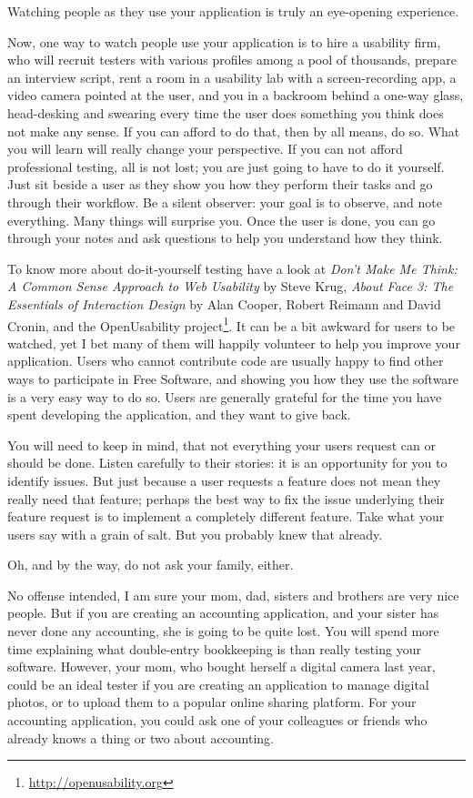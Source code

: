 Watching people as they use your application is truly an eye-opening experience.

Now, one way to watch people use your application is to hire a usability firm,
who will recruit testers with various profiles among a pool of thousands,
prepare an interview script, rent a room in a usability lab with a
screen-recording app, a video camera pointed at the user, and you in a
backroom behind a one-way glass, head-desking and swearing every time the user
does something you think does not make any sense. If you can afford to do that,
then by all means, do so. What you will learn will really change your
perspective. If you can not afford professional testing, all is not lost; you
are just going to have to do it yourself. Just sit beside a user as they show
you how they perform their tasks and go through their workflow. Be a silent
observer: your goal is to observe, and note everything. Many things will
surprise you. Once the user is done, you can go through your notes and ask
questions to help you understand how they think.

To know more about
do-it-yourself testing have a look at \textit{Don't Make Me Think: A Common
Sense Approach to Web Usability} by Steve Krug, \textit{About Face 3: The
Essentials of Interaction Design} by Alan Cooper, Robert Reimann and David
Cronin, and the OpenUsability project\footnote{\url{http://openusability.org}}.
It can be a bit awkward for users to be watched, yet I bet many of them will
happily volunteer to help you improve your application. Users who cannot
contribute code are usually happy to find other ways to participate in Free Software, and showing
you how they use the software is a very easy way to do so. Users are generally
grateful for the time you have spent developing the application, and they want
to give back.

You will need to keep in mind, that not everything your users request
can or should be done. Listen carefully to their stories: it is an opportunity
for you to identify issues. But just because a user requests a feature does not mean
they really need that feature; perhaps the best way to fix the issue underlying
their feature request is to implement a completely different feature. Take what
your users say with a grain of salt. But you probably knew that already. 

Oh, and by the way, do not ask your family, either.

No offense intended, I am sure your mom, dad, sisters and brothers are very nice people.
But if you are creating an accounting application, and your sister has never done any accounting,
she is going to be quite lost. You will spend more time explaining what double-entry bookkeeping is
 than really testing your software. However, your mom, who bought herself a digital camera last year,
could be an ideal tester if you are creating an application to manage digital photos, or to upload
them to a popular online sharing platform. For your accounting application, you could ask one of
your colleagues or friends who already knows a thing or two about accounting.

